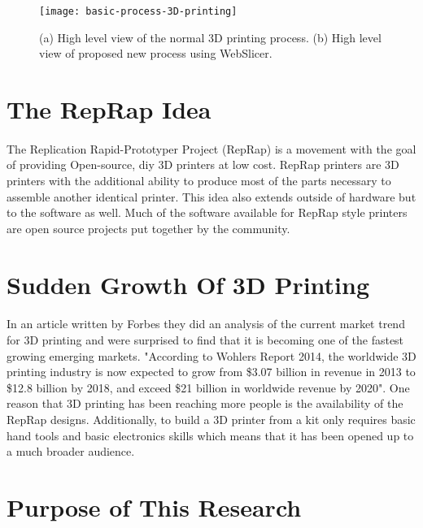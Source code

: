 \begin{figure}[!ht]
  \centering
  \texttt{[image: basic-process-3D-printing]}
  \caption{(a) High level view of the normal 3D printing process. (b) High level view of proposed new process using WebSlicer.}
\end{figure}


\section{The RepRap Idea}
\paragraph{}
The Replication Rapid-Prototyper Project (RepRap) is a movement with the goal of providing Open-source, diy 3D printers at low cost.
RepRap printers are 3D printers with the additional ability to produce most of the parts necessary to assemble another identical printer.
This idea also extends outside of hardware but to the software as well.
Much of the software available for RepRap style printers are open source projects put together by the community.

\section{Sudden Growth Of 3D Printing}
\paragraph{}
In an article written by Forbes they did an analysis of the current market trend for 3D printing and were surprised to find that it is becoming one of the fastest growing emerging markets.
"According to Wohlers Report 2014, the worldwide 3D printing industry is now expected to grow from \$3.07 billion in revenue in 2013 to \$12.8 billion by 2018, and exceed \$21 billion in worldwide revenue by 2020". \citet{forbes3D}
One reason that 3D printing has been reaching more people is the availability of the RepRap designs.
Additionally, to build a 3D printer from a kit only requires basic hand tools and basic electronics skills which means that it has been opened up to a much broader audience.

\section{Purpose of This Research}
